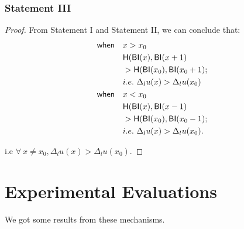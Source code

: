 \documentclass{article}
\begin{document}
\subsubsection{Statement III}
\begin{proof}
From Statement I and Statement II, we can conclude that:
\begin{equation*}
\begin{split}
\mathsf{when} \quad	& x > x_0 \\
					& \mathsf{H}(\mathsf{BI}(x), \mathsf{BI}(x + 1) \\
					& > \mathsf{H}(\mathsf{BI}(x_0), \mathsf{BI}(x_0 + 1); \\
					& i.e.\ \Delta_l u(x) > \Delta_l u(x_0)\\
\mathsf{when} \quad	& x < x_0 \\
					& \mathsf{H}(\mathsf{BI}(x), \mathsf{BI}(x - 1) \\
					& > \mathsf{H}(\mathsf{BI}(x_0), \mathsf{BI}(x_0 - 1); \\
					& i.e.\ \Delta_l u(x) > \Delta_l u(x_0).\\
\end{split}
\end{equation*}

i.e $\forall \ x \neq x_0, \Delta_l u(x) > \Delta_l u(x_0)$.

\end{proof}

\section{Experimental Evaluations}
We got some results from these mechanisms.
\end{document}
